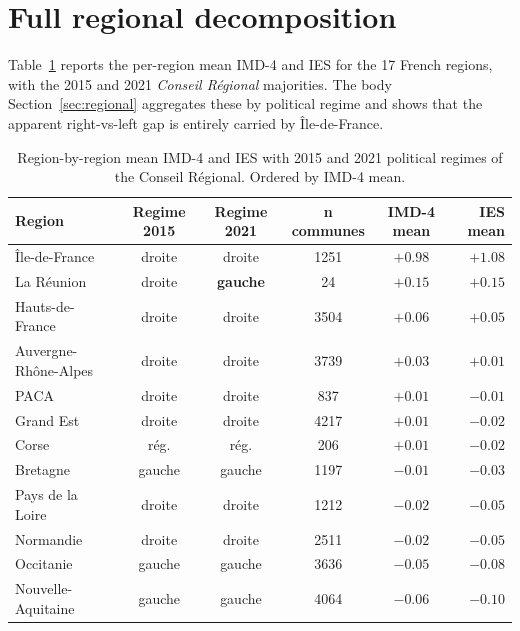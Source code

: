 \documentclass[11pt,a4paper]{article}
\begin{document}
\section{Full regional decomposition}
\label{app:regional-full}

Table~\ref{tab:regional} reports the per-region mean IMD-4 and IES
for the 17 French regions, with the 2015 and 2021 \emph{Conseil
R\'egional} majorities.  The body Section~\ref{sec:regional}
aggregates these by political regime and shows that the apparent
right-vs-left gap is entirely carried by \^Ile-de-France.

\begin{table}[H]
\centering
\caption{Region-by-region mean IMD-4 and IES with 2015 and 2021
political regimes of the Conseil R\'egional.  Ordered by IMD-4
mean.}
\label{tab:regional}
\small
\begin{tabular}{@{}lccccr@{}}
\toprule
Region & Regime 2015 & Regime 2021 & n communes & IMD-4 mean & IES mean \\
\midrule
\^Ile-de-France                & droite       & droite       &  1251 & $+0.98$ & $+1.08$ \\
La R\'eunion                   & droite       & \textbf{gauche} & 24 & $+0.15$ & $+0.15$ \\
Hauts-de-France                & droite       & droite       &  3504 & $+0.06$ & $+0.05$ \\
Auvergne-Rh\^one-Alpes         & droite       & droite       &  3739 & $+0.03$ & $+0.01$ \\
PACA                           & droite       & droite       &   837 & $+0.01$ & $-0.01$ \\
Grand Est                      & droite       & droite       &  4217 & $+0.01$ & $-0.02$ \\
Corse                          & r\'eg.       & r\'eg.       &   206 & $+0.01$ & $-0.02$ \\
Bretagne                       & gauche       & gauche       &  1197 & $-0.01$ & $-0.03$ \\
Pays de la Loire               & droite       & droite       &  1212 & $-0.02$ & $-0.05$ \\
Normandie                      & droite       & droite       &  2511 & $-0.02$ & $-0.05$ \\
Occitanie                      & gauche       & gauche       &  3636 & $-0.05$ & $-0.08$ \\
Nouvelle-Aquitaine             & gauche       & gauche       &  4064 & $-0.06$ & $-0.10$ \\

\end{tabular}
\end{table}
\end{document}
